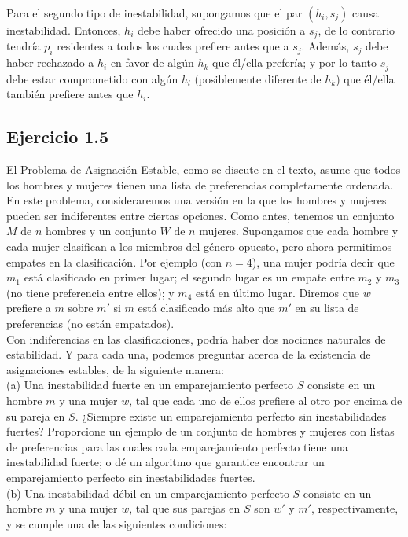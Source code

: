 \documentclass{article}
\begin{document}
Para el segundo tipo de inestabilidad, supongamos que el par $(h_i, s_j)$ causa inestabilidad. Entonces, $h_i$ debe haber ofrecido una posición a $s_j$, de lo contrario tendría $p_i$ residentes a todos los cuales prefiere antes que a $s_j$. Además, $s_j$ debe haber rechazado a $h_i$ en favor de algún $h_k$ que él/ella prefería; y por lo tanto $s_j$ debe estar comprometido con algún $h_l$ (posiblemente diferente de $h_k$) que él/ella también prefiere antes que $h_i$.

\subsection{Ejercicio 1.5}
El Problema de Asignación Estable, como se discute en el texto, asume que todos los hombres y mujeres tienen una lista de preferencias completamente ordenada. En este problema, consideraremos una versión en la que los hombres y mujeres pueden ser indiferentes entre ciertas opciones. Como antes, tenemos un conjunto $M$ de $n$ hombres y un conjunto $W$ de $n$ mujeres. Supongamos que cada hombre y cada mujer clasifican a los miembros del género opuesto, pero ahora permitimos empates en la clasificación. Por ejemplo (con $n = 4$), una mujer podría decir que $m_1$ está clasificado en primer lugar; el segundo lugar es un empate entre $m_2$ y $m_3$ (no tiene preferencia entre ellos); y $m_4$ está en último lugar. Diremos que $w$ prefiere a $m$ sobre $m'$ si $m$ está clasificado más alto que $m'$ en su lista de preferencias (no están empatados).\\

Con indiferencias en las clasificaciones, podría haber dos nociones naturales de estabilidad. Y para cada una, podemos preguntar acerca de la existencia de asignaciones estables, de la siguiente manera:\\

(a) Una inestabilidad fuerte en un emparejamiento perfecto $S$ consiste en un hombre $m$ y una mujer $w$, tal que cada uno de ellos prefiere al otro por encima de su pareja en $S$. ¿Siempre existe un emparejamiento perfecto sin inestabilidades fuertes? Proporcione un ejemplo de un conjunto de hombres y mujeres con listas de preferencias para las cuales cada emparejamiento perfecto tiene una inestabilidad fuerte; o dé un algoritmo que garantice encontrar un emparejamiento perfecto sin inestabilidades fuertes.\\

(b) Una inestabilidad débil en un emparejamiento perfecto $S$ consiste en un hombre $m$ y una mujer $w$, tal que sus parejas en $S$ son $w'$ y $m'$, respectivamente, y se cumple una de las siguientes condiciones:
\end{document}
